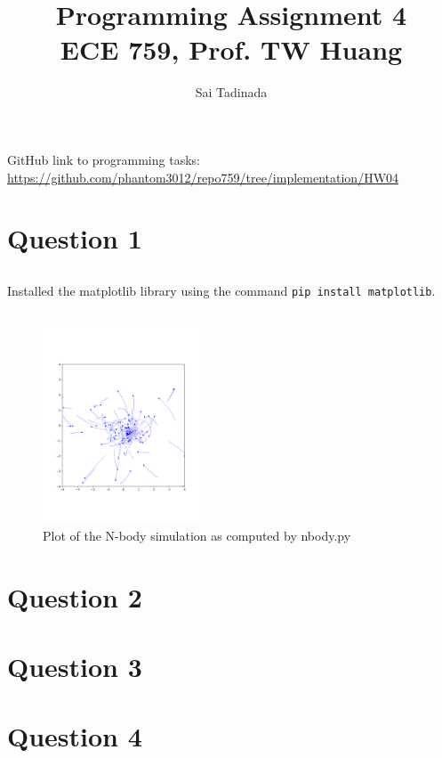 \documentclass[12pt]{article}
\title{Programming Assignment 4 \\ \small{ECE 759, Prof. TW Huang}}
\author{Sai Tadinada}
\date{}
\begin{document}
\maketitle

GitHub link to programming tasks: \\ \url{https://github.com/phantom3012/repo759/tree/implementation/HW04}

\section{Question 1}
\subsection{}
Installed the matplotlib library using the command \texttt{pip install matplotlib}.
\subsection{}
\begin{figure}[ht]
    \centering
    \includegraphics[width=0.4175\textwidth]{task1.png}
    \caption{Plot of the N-body simulation as computed by nbody.py}
\end{figure}

\section{Question 2}

\subsection{}

\section{Question 3}
\subsection{}

\section{Question 4}
\subsection{}
\subsection{}
\end{document}
